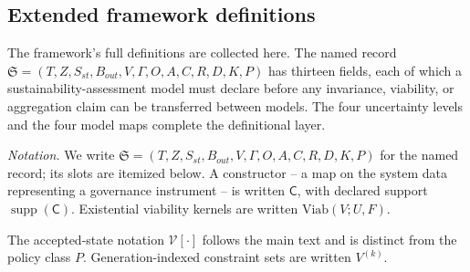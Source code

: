 \subsection{Extended framework definitions}

The framework's full definitions are collected here. The named record $\mathfrak{S} = (T, Z, S_{st}, B_{out}, V, \Gamma, O, A, C, R, D, K, P)$ has thirteen fields, each of which a sustainability-assessment model must declare before any invariance, viability, or aggregation claim can be transferred between models. The four uncertainty levels and the four model maps complete the definitional layer.

\emph{Notation.} We write $\mathfrak{S} = (T, Z, S_{st}, B_{out}, V, \Gamma, O, A, C, R, D, K, P)$ for the named record; its slots are itemized below. A constructor -- a map on the system data representing a governance instrument -- is written $\mathsf{C}$, with declared support $\operatorname{supp}(\mathsf{C})$. Existential viability kernels are written $\mathrm{Viab}(V; U, F)$.

The accepted-state notation $\mathcal{V}[\cdot]$ follows the main text and is distinct from the policy class $P$. Generation-indexed constraint sets are written $V^{(k)}$.

